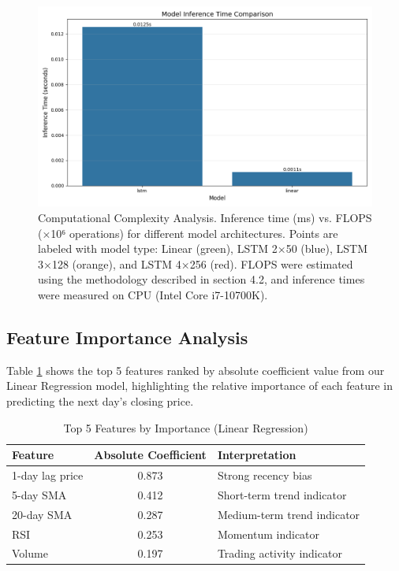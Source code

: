 \documentclass[sigconf]{acmart}
\begin{document}
\begin{figure}[h]
\centering
\includegraphics[width=\linewidth]{comparison_inference_time_20250429_182659.png}
\caption{Computational Complexity Analysis. Inference time (ms) vs. FLOPS (×10⁶ operations) for different model architectures. Points are labeled with model type: Linear (green), LSTM 2×50 (blue), LSTM 3×128 (orange), and LSTM 4×256 (red). FLOPS were estimated using the methodology described in section 4.2, and inference times were measured on CPU (Intel Core i7-10700K).}
\label{fig:complexity}
\end{figure}

\subsection{Feature Importance Analysis}

Table \ref{tab:feature_imp} shows the top 5 features ranked by absolute coefficient value from our Linear Regression model, highlighting the relative importance of each feature in predicting the next day's closing price.

\begin{table}[h]
\caption{Top 5 Features by Importance (Linear Regression)}
\label{tab:feature_imp}
\begin{tabular}{lcp{4cm}}
\toprule
\textbf{Feature} & \textbf{Absolute Coefficient} & \textbf{Interpretation} \\
\midrule
1-day lag price & 0.873 & Strong recency bias \\
5-day SMA & 0.412 & Short-term trend indicator \\
20-day SMA & 0.287 & Medium-term trend indicator \\
RSI & 0.253 & Momentum indicator \\
Volume & 0.197 & Trading activity indicator \\
\bottomrule
\end{tabular}
\end{table}
\end{document}
